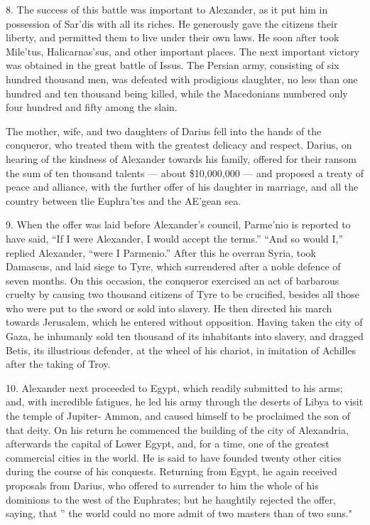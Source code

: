 \documentclass[openany,a4paper]{memoir}
\begin{document}
8. The success of this battle was important to Alexander, 
as it put him in possession of Sar'dis with all its riches. He 
generously gave the citizens their liberty, and permitted them 
to live under their own laws. He soon after took Mile'tus, 
Halicarnas'sus, and other important places. The next important victory was obtained in the great battle of Issus. 
The Persian army, consisting of six hundred thousand men, 
was defeated with prodigious slaughter, no less than one 
hundred and ten thousand being killed, while the Macedonians numbered only four hundred and fifty among the slain. 

The mother, wife, and two daughters of Darius fell into the 
hands of the conqueror, who treated them with the greatest 
delicacy and respect. Darius, on hearing of the kindness of 
Alexander towards his family, offered for their ransom the 
sum of ten thousand talents — about \$10,000,000 — and proposed a treaty of peace and alliance, with the further offer of 
his daughter in marriage, and all the country between tlie 
Euphra'tes and the AE'gean sea. 

9. When the offer was laid before Alexander's council, Parme'nio is reported to have said, ``If I were Alexander, I 
would accept the terms.'' ``And so would I,'' replied Alexander, ``were I Parmenio.'' After this he overran Syria, 
took Damascus, and laid siege to Tyre, which surrendered 
after a noble defence of seven months. On this occasion, the 
conqueror exercised an act of barbarous cruelty by causing 
two thousand citizens of Tyre to be crucified, besides all those 
who were put to the sword or sold into slavery. He then 
directed his march towards Jerusalem, which he entered without opposition. Having taken the city of Gaza, he inhumanly 
sold ten thousand of its inhabitants into slavery, and dragged 
Betis, its illustrious defender, at the wheel of his chariot, in 
imitation of Achilles after the taking of Troy. 

10. Alexander next proceeded to Egypt, which readily submitted to his arms; and, with incredible fatigues, he led his 
army through the deserts of Libya to visit the temple of 
Jupiter- Ammon, and caused himself to be proclaimed the son 
of that deity. On his return he commenced the building 
of the city of Alexandria, afterwards the capital of Lower 
Egypt, and, for a time, one of the greatest commercial cities 
in the world. He is said to have founded twenty other cities 
during the course of his conquests. Returning from Egypt, 
he again received proposals from Darius, who offered to surrender to him the whole of his dominions to the west of the 
Euphrates; but he haughtily rejected the offer, saying, that 
'' the world could no more admit of two masters than of two 
suns." 
\end{document}
